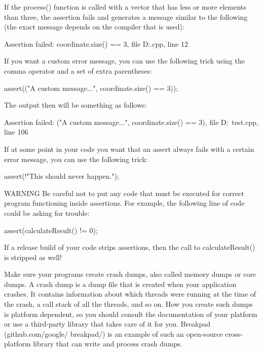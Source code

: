 If the process() function is called with a vector that has less or more elements than three, the assertion fails and generates a message similar to the following (the exact message depends on the compiler that is used):

\begin{shell}
Assertion failed: coordinate.size() == 3, file D:\test\test.cpp, line 12
\end{shell}

If you want a custom error message, you can use the following trick using the comma operator and a set of extra parentheses:

\begin{cpp}
assert(("A custom message...", coordinate.size() == 3));
\end{cpp}

The output then will be something as follows:

\begin{shell}
Assertion failed: ("A custom message...", coordinate.size() == 3), file D:\test\
test.cpp, line 106
\end{shell}

If at some point in your code you want that an assert always fails with a certain error message, you can use the following trick:

\begin{cpp}
assert(!"This should never happen.");
\end{cpp}

\begin{myWarning}{WARNING}
Be careful not to put any code that must be executed for correct program functioning inside assertions. For example, the following line of code could be asking for trouble:

\begin{cpp}
assert(calculateResult() != 0);
\end{cpp}

If a release build of your code strips assertions, then the call to calculateResult() is stripped as well!
\end{myWarning}


Make sure your programs create crash dumps, also called memory dumps or core dumps. A crash dump is a dump file that is created when your application crashes. It contains information about which threads were running at the time of the crash, a call stack of all the threads, and so on. How you create such dumps is platform dependent, so you should consult the documentation of your platform or use a third-party library that takes care of it for you. Breakpad (github.com/google/ breakpad/) is an example of such an open-source cross-platform library that can write and process crash dumps.

